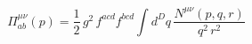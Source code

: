 \begin{equation}
\Pi^{\mu\nu}_{ab}(p) = \frac{1}{2}\,g^2\,f^{acd}f^{bcd}\int d^Dq\,\frac{N^{\mu\nu}(p,q,r)}{q^2\,r^2}
\end{equation}

